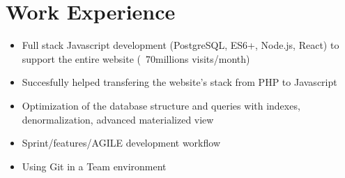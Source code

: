 
\section{Work Experience}
\begin{minipage}{.15\textwidth}
    \centerline{}
\end{minipage}%
\hspace{5mm}
\begin{minipage}{.9\textwidth}
    \raggedright
    \begin{minipage}[t]{.8\textwidth}
        \begin{itemize}
            \item Full stack Javascript development (PostgreSQL, ES6+, Node.js, React) to support the entire website (~70millions visits/month)
            \item Succesfully helped transfering the website's stack from PHP to Javascript
            \item Optimization of the database structure and queries with indexes, denormalization, advanced materialized view
            \item Sprint/features/AGILE development workflow
            \item Using Git in a Team environment
        \end{itemize}
    \end{minipage}
\end{minipage}
